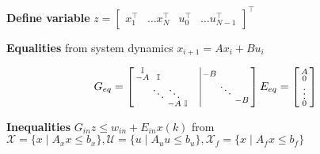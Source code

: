 \textbf{Define variable} $z =
	\begin{bmatrix}
		x_1^\top & \dots x_N^\top & u_0^\top & \dots u_{N-1}^\top
	\end{bmatrix}^\top$

\textbf{Equalities} from system dynamics
$x_{i+1} = Ax_i + Bu_i$

\[
	G_{eq} =
	\begin{bmatrix}
		\begin{smallmatrix}
			\mathbb{I}& & & \\
			-A & \mathbb{I} && \\
			&  \ddots & \ddots \\
			&&-A & \mathbb{I}
		\end{smallmatrix}
		 & \vline
		\begin{smallmatrix}
			-B \\
			& \ddots \\
			& &-B
		\end{smallmatrix}
	\end{bmatrix}
	E_{eq} =
	\begin{bsmallmatrix}
		A      \\
		0      \\
		\vdots \\
		0
	\end{bsmallmatrix}
\]

\textbf{Inequalities }
$G_{in}z \leq w_{in} + E_{in}x(k)$ from
$\mathcal{X}   = \{x \mid A_x x \leq b_x\},
	\mathcal{U}   = \{u \mid A_u u \leq b_u\},
	\mathcal{X}_f = \{x \mid A_f x \leq b_f\}$

